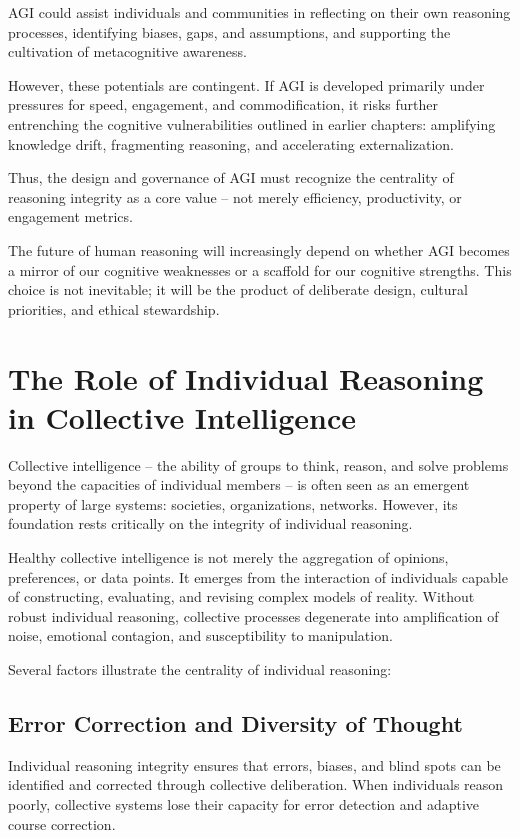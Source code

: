 AGI could assist individuals and communities in reflecting on their own
reasoning processes, identifying biases, gaps, and assumptions, and
supporting the cultivation of metacognitive awareness.

However, these potentials are contingent. If AGI is developed primarily
under pressures for speed, engagement, and commodification, it risks
further entrenching the cognitive vulnerabilities outlined in earlier
chapters: amplifying knowledge drift, fragmenting reasoning, and
accelerating externalization.

Thus, the design and governance of AGI must recognize the centrality of
reasoning integrity as a core value -- not merely efficiency,
productivity, or engagement metrics.

The future of human reasoning will increasingly depend on whether AGI
becomes a mirror of our cognitive weaknesses or a scaffold for our
cognitive strengths. This choice is not inevitable; it will be the
product of deliberate design, cultural priorities, and ethical
stewardship.



\section{The Role of Individual Reasoning in Collective Intelligence}

Collective intelligence -- the ability of groups to think, reason, and
solve problems beyond the capacities of individual members -- is often
seen as an emergent property of large systems: societies, organizations,
networks. However, its foundation rests critically on the integrity of
individual reasoning.

Healthy collective intelligence is not merely the aggregation of
opinions, preferences, or data points. It emerges from the interaction
of individuals capable of constructing, evaluating, and revising complex
models of reality. Without robust individual reasoning, collective
processes degenerate into amplification of noise, emotional contagion,
and susceptibility to manipulation.

Several factors illustrate the centrality of individual reasoning:

\subsection{Error Correction and Diversity of Thought}

Individual reasoning integrity ensures that errors, biases, and blind
spots can be identified and corrected through collective deliberation.
When individuals reason poorly, collective systems lose their capacity
for error detection and adaptive course correction.

